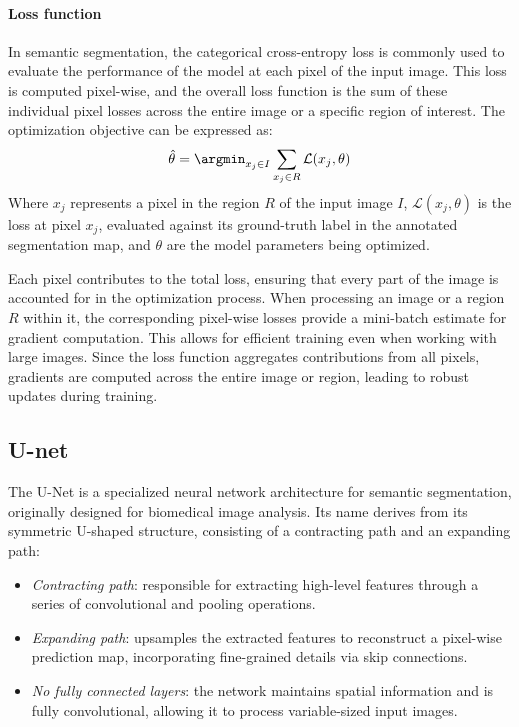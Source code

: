 \paragraph*{Loss function}
In semantic segmentation, the categorical cross-entropy loss is commonly used to evaluate the performance of the model at each pixel of the input image. 
This loss is computed pixel-wise, and the overall loss function is the sum of these individual pixel losses across the entire image or a specific region of interest.
The optimization objective can be expressed as:
\[\hat{\theta}=\argmin_{x_j\in I}\sum_{x_j\in R}\mathcal{L}(x_j,\theta)\]
Where $x_j$ represents a pixel in the region $R$ of the input image $I$, $\mathcal{L}(x_j,\theta)$ is the loss at pixel $x_j$, evaluated against its ground-truth label in the annotated segmentation map, and $\theta$ are the model parameters being optimized.

Each pixel contributes to the total loss, ensuring that every part of the image is accounted for in the optimization process.
When processing an image or a region $R$ within it, the corresponding pixel-wise losses provide a mini-batch estimate for gradient computation. 
This allows for efficient training even when working with large images.
Since the loss function aggregates contributions from all pixels, gradients are computed across the entire image or region, leading to robust updates during training.

\subsection{U-net}
The U-Net is a specialized neural network architecture for semantic segmentation, originally designed for biomedical image analysis. 
Its name derives from its symmetric U-shaped structure, consisting of a contracting path and an expanding path: 
\begin{itemize}
    \item \textit{Contracting path}: responsible for extracting high-level features through a series of convolutional and pooling operations.
    \item \textit{Expanding path}: upsamples the extracted features to reconstruct a pixel-wise prediction map, incorporating fine-grained details via skip connections.
    \item \textit{No fully connected layers}: the network maintains spatial information and is fully convolutional, allowing it to process variable-sized input images.
\end{itemize}

